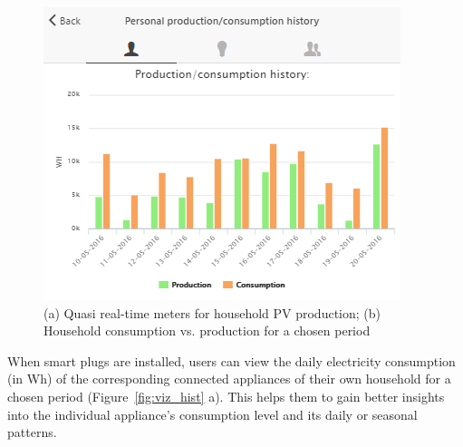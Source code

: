 \begin{figure}
\begin{center}
\begin{minipage}[htb]{0.43\linewidth}
        \end{minipage}
 	\hfill 
         \begin{minipage}[htb]{0.55\linewidth}    
	        \includegraphics[width=1\linewidth]{img/historicalcomparison_prodcons.png} 
                \end{minipage}
      \end{center}
    \caption{(a) Quasi real-time meters for household PV production; (b) Household consumption vs. production for a chosen period
}
\label{fig:viz_rt}
\end{figure}
%
When smart plugs are installed, users can view the daily electricity consumption (in Wh) of the corresponding connected appliances of their own household for a chosen period (Figure~\ref{fig:viz_hist} a). This helps them to gain better insights into the individual appliance's consumption level and its daily or seasonal patterns. 
